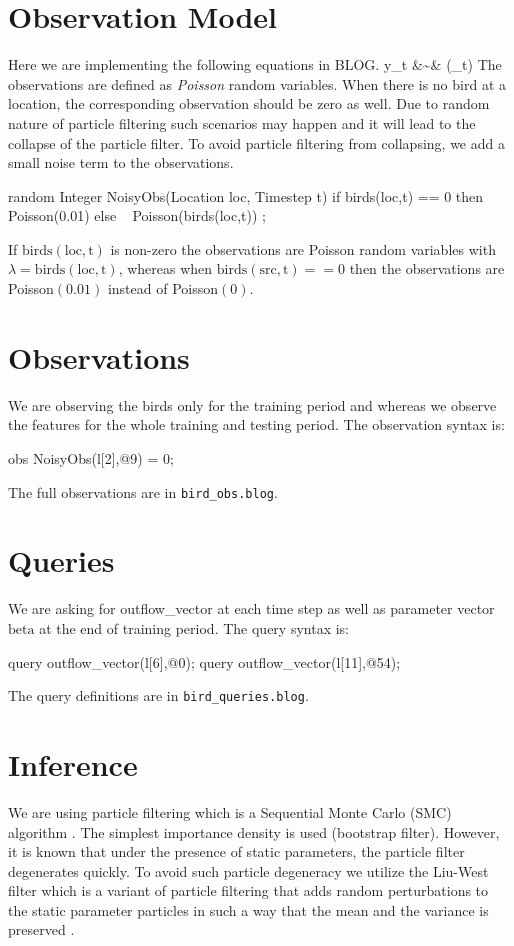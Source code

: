 \documentclass[11pt]{article}
\begin{document}
\section{Observation Model}
Here we are implementing the following equations in BLOG.
\beq
	y_t &\sim& (_t)
\eeq
The observations are defined as \emph{Poisson} random variables. When there is no bird at a location, the corresponding observation should be zero as well. Due to random nature of particle filtering such scenarios may happen and it will lead to the collapse of the particle filter. To avoid particle filtering from collapsing, we add a small noise term to the observations.
\begin{blogcode}
random Integer NoisyObs(Location loc, Timestep t){
   if birds(loc,t) == 0 then ~ Poisson(0.01)
   else ~ Poisson(birds(loc,t))
};
\end{blogcode}
If $\mathrm{birds(loc,t)}$ is non-zero the observations are Poisson random variables with $\lambda = \mathrm{birds(loc,t)}$, whereas when $\mathrm{birds(src,t)}==0$ then the observations are Poisson$(0.01)$ instead of Poisson$(0)$.

\section{Observations}
We are observing the birds only for the training period and whereas we observe the features for the whole training and testing period. The observation syntax is:
\begin{blogcode}
  obs NoisyObs(l[2],@9) = 0;
\end{blogcode}
The full observations are in \verb|bird_obs.blog|.

\section{Queries}
We are asking for outflow\_vector at each time step as well as parameter vector $\mathrm{beta}$ at the end of training period. The query syntax is:
\begin{blogcode}
  query outflow_vector(l[6],@0);
  query outflow_vector(l[11],@54);
\end{blogcode}
The query definitions are in \verb|bird_queries.blog|. 

\section{Inference}
We are using particle filtering which is a Sequential Monte Carlo (SMC) algorithm \cite{doucet2011tutorial}. The simplest importance density is used (bootstrap filter). However, it is known that under the presence of static parameters, the particle filter degenerates quickly. To avoid such particle degeneracy we utilize the Liu-West filter which is a variant of particle filtering that adds random perturbations to the static parameter particles in such a way that the mean and the variance is preserved  \cite{liu2001combined}.
\end{document}
